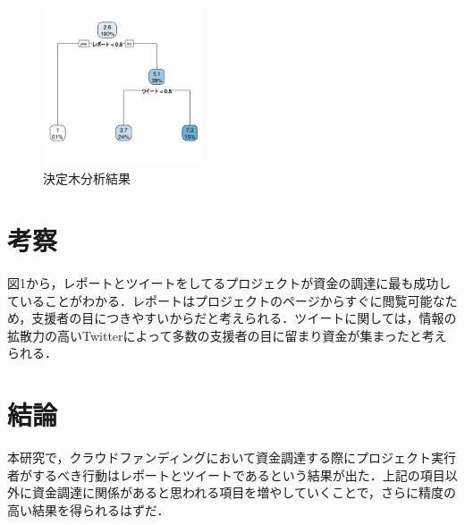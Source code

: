 \documentclass[uplatex,twocolumn,dvipdfmx]{jsarticle}
\begin{document}
\begin{figure}[h]
\centering
\includegraphics[width=4.7cm,clip]{ket.pdf}
\caption{決定木分析結果}\label{サンプル図}
\end{figure}

\section{考察}
図1から，レポートとツイートをしてるプロジェクトが資金の調達に最も成功していることがわかる．レポートはプロジェクトのページからすぐに閲覧可能なため，支援者の目につきやすいからだと考えられる．ツイートに関しては，情報の拡散力の高いTwitterによって多数の支援者の目に留まり資金が集まったと考えられる．


\section{結論}
本研究で，クラウドファンディングにおいて資金調達する際にプロジェクト実行者がするべき行動はレポートとツイートであるという結果が出た．上記の項目以外に資金調達に関係があると思われる項目を増やしていくことで，さらに精度の高い結果を得られるはずだ．


\end{document}
